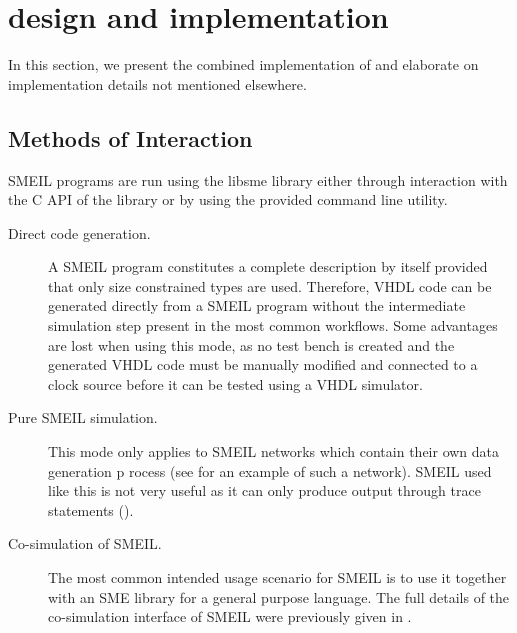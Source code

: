 \chapter{\libsme{} design and implementation}

In this section, we present the combined implementation of \libsme{} and
elaborate on implementation details not mentioned elsewhere.

\section{Methods of Interaction}
\label{sec:using}
SMEIL programs are run using the {\ttfamily libsme} library either through interaction
with the C API of the library or by using the provided command line utility.

\begin{description}
\item[Direct code generation.] A SMEIL program constitutes a complete
  description by itself provided that only size constrained types are
  used. Therefore, VHDL code can be generated directly from a SMEIL program
  without the intermediate simulation step present in the most common
  workflows. Some advantages are lost when using this mode, as no test bench is
  created and the generated VHDL code must be manually modified and connected to
  a clock source before it can be tested using a VHDL simulator.
\item[Pure SMEIL simulation.] This mode only applies to SMEIL networks which
  contain their own data generation p rocess (see  for an example
  of such a network). SMEIL used like this is not very useful as it can only
  produce output through {\ttfamily trace} statements ().
\item[Co-simulation of SMEIL.] The most common intended usage scenario for SMEIL
  is to use it together with an SME library for a general purpose language. The
  full details of the co-simulation interface of SMEIL were previously given in
  .
\end{description}


